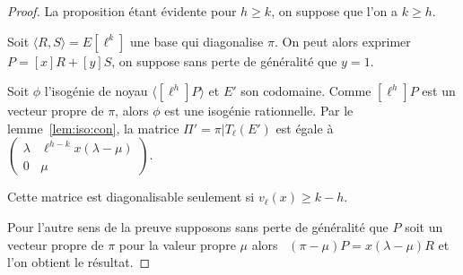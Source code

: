 \documentclass[10pt,a4paper]{book}
\theoremstyle{plain}
\theoremstyle{definition}
\theoremstyle{definition}
\theoremstyle{definition}
\theoremstyle{definition}
\theoremstyle{remark}
\theoremstyle{remark}
\theoremstyle{definition}
\begin{document}
\begin{proof}
La proposition étant évidente pour $h \geqslant k$,
on suppose que l'on a $k \geqslant h$.

Soit $\langle R,S \rangle =E[\ell^k]$ une base qui diagonalise $\pi$.
On peut alors exprimer $P=[x]R+[y]S$, on suppose sans perte de généralité
que $y=1$.

Soit $\phi$ l'isogénie de noyau $\langle [\ell^h]P \rangle$ et $E'$ son 
codomaine. Comme $[\ell^h]P$ est un vecteur propre de $\pi$, alors $\phi$ est 
une isogénie rationnelle. Par le lemme~\ref{lem:iso:con}, la matrice 
$\Pi'=\pi|T_{\ell}(E')$ est égale à $\left ( \begin{smallmatrix}\lambda& \ell^{h-k} 
x (\lambda-\mu)\\ 0 & \mu \end{smallmatrix}\right )$.  

Cette matrice est diagonalisable seulement si $v_{\ell}(x) \geqslant k - h$.

Pour l'autre sens de la preuve supposons sans perte de généralité que $P$ soit 
un vecteur propre de $\pi$ pour la valeur propre $\mu$ alors 
~$(\pi - \mu) P = x (\lambda - \mu) R$ et l'on obtient le résultat.
\end{proof}
\end{document}
